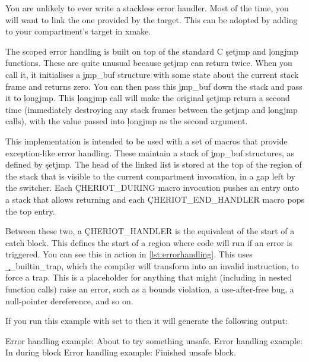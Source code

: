 You are unlikely to ever write a stackless error handler.
Most of the time, you will want to link the one provided by the  target.
This can be adopted by adding  to your compartment's target in xmake.

\begin{note}
	The scoped error handling is built on top of the standard C \c{setjmp} and \c{longjmp} functions.
	These are quite unusual because \c{setjmp} can return twice.
	When you call it, it initialises a \c{jmp_buf} structure with some state about the current stack frame and returns zero.
	You can then pass this \c{jmp_buf} down the stack and pass it to \c{longjmp}.
	This \c{longjmp} call will make the original \c{setjmp} return a second time (immediately destroying any stack frames between the \c{setjmp} and \c{longjmp} calls), with the value passed into \c{longjmp} as the second argument.
\end{note}

This implementation is intended to be used with a set of macros that provide exception-like error handling.
These maintain a stack of \c{jmp_buf} structures, as defined by \c{setjmp}.
The head of the linked list is stored at the top of the region of the stack that is visible to the current compartment invocation, in a gap left by the switcher.
Each \c{CHERIOT_DURING} macro invocation pushes an entry onto a stack that allows returning and each \c{CHERIOT_END_HANDLER} macro pops the top entry.

Between these two, a \c{CHERIOT_HANDLER} is the equivalent of the start of a catch block.
This defines the start of a region where code will run if an error is triggered.
You can see this in action in \ref{lst:errorhandling}.
This uses \c{__builtin_trap}, which the compiler will transform into an invalid instruction, to force a trap.
This is a placeholder for anything that might (including in nested function calls) raise an error, such as a bounds violation, a use-after-free bug, a null-pointer dereference, and so on.


\codelisting[marker=error,caption=Example of using scoped error handling,label=lst:errorhandling, filename=examples/error_handling/errors.cc]{}

If you run this example with  set to  then it will generate the following output:

\begin{console}
Error handling example: About to try something unsafe.
Error handling example: In during block
Error handling example: Finished unsafe block.
\end{console}

